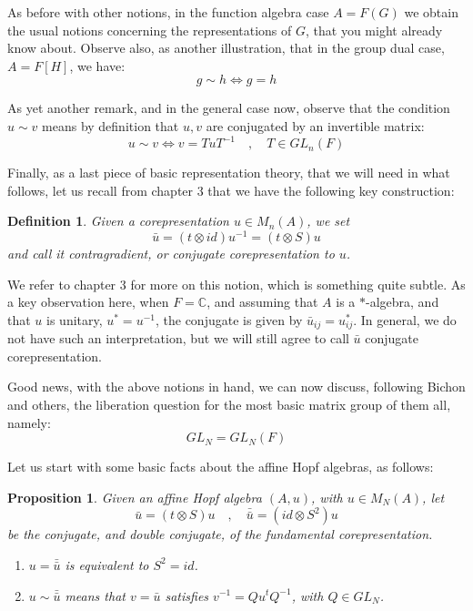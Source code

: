 \documentclass[12pt]{amsbook}
\newtheorem{definition}[theorem]{Definition}
\newtheorem{proposition}[theorem]{Proposition}
\begin{document}
\bigskip

As before with other notions, in the function algebra case $A=F(G)$ we obtain the usual notions concerning the representations of $G$, that you might already know about. Observe also, as another illustration, that in the group dual case, $A=F[H]$, we have:
$$g\sim h\iff g=h$$

As yet another remark, and in the general case now, observe that the condition $u\sim v$ means by definition that $u,v$ are conjugated by an invertible matrix:
$$u\sim v\iff v=TuT^{-1}\quad,\quad T\in GL_n(F)$$ 

Finally, as a last piece of basic representation theory, that we will need in what follows, let us recall from chapter 3 that we have the following key construction:

\begin{definition}
Given a corepresentation $u\in M_n(A)$, we set
$$\bar{u}=(t\otimes id)u^{-1}=(t\otimes S)u$$
and call it contragradient, or conjugate corepresentation to $u$.
\end{definition}

We refer to chapter 3 for more on this notion, which is something quite subtle. As a key observation here, when $F=\mathbb C$, and assuming that $A$ is a $*$-algebra, and that $u$ is unitary, $u^*=u^{-1}$, the conjugate is given by $\bar{u}_{ij}=u_{ij}^*$. In general, we do not have such an interpretation, but we will still agree to call $\bar{u}$ conjugate corepresentation.

\bigskip

Good news, with the above notions in hand, we can now discuss, following Bichon and others, the liberation question for the most basic matrix group of them all, namely:
$$GL_N=GL_N(F)$$

Let us start with some basic facts about the affine Hopf algebras, as follows:

\begin{proposition}
Given an affine Hopf algebra $(A,u)$, with $u\in M_N(A)$, let
$$\bar{u}=(t\otimes S)u\quad,\quad \bar{\bar{u}}=(id\otimes S^2)u$$
be the conjugate, and double conjugate, of the fundamental corepresentation.
\begin{enumerate}
\item $u=\bar{\bar{u}}$ is equivalent to $S^2=id$.

\item $u\sim\bar{\bar{u}}$ means that $v=\bar{u}$ satisfies $v^{-1}=Qu^tQ^{-1}$, with $Q\in GL_N$.
\end{enumerate} 
\end{proposition}
\end{document}
